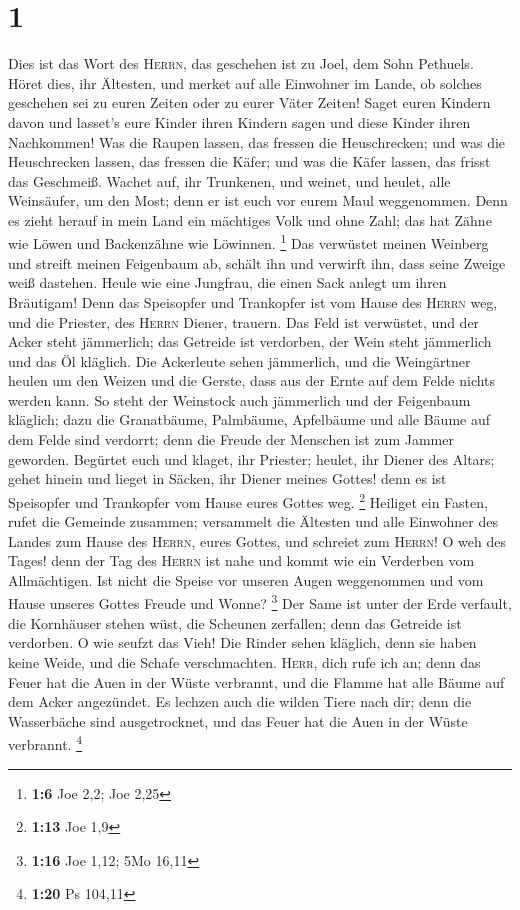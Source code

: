 \hypertarget{section}{%
\section{1}\label{section}}

 Dies ist das Wort des \textsc{Herrn}, das geschehen ist
zu Joel, dem Sohn Pethuels.  Höret dies, ihr Ältesten, und
merket auf alle Einwohner im Lande, ob solches geschehen sei zu euren
Zeiten oder zu eurer Väter Zeiten!  Saget euren Kindern
davon und lasset's eure Kinder ihren Kindern sagen und diese Kinder
ihren Nachkommen!  Was die Raupen lassen, das fressen die
Heuschrecken; und was die Heuschrecken lassen, das fressen die Käfer;
und was die Käfer lassen, das frisst das Geschmeiß. 
Wachet auf, ihr Trunkenen, und weinet, und heulet, alle Weinsäufer, um
den Most; denn er ist euch vor eurem Maul weggenommen. 
Denn es zieht herauf in mein Land ein mächtiges Volk und ohne Zahl; das
hat Zähne wie Löwen und Backenzähne wie Löwinnen. \footnote{\textbf{1:6}
  Joe 2,2; Joe 2,25}  Das verwüstet meinen Weinberg und
streift meinen Feigenbaum ab, schält ihn und verwirft ihn, dass seine
Zweige weiß dastehen.  Heule wie eine Jungfrau, die einen
Sack anlegt um ihren Bräutigam!  Denn das Speisopfer und
Trankopfer ist vom Hause des \textsc{Herrn} weg, und die Priester, des
\textsc{Herrn} Diener, trauern.  Das Feld ist verwüstet,
und der Acker steht jämmerlich; das Getreide ist verdorben, der Wein
steht jämmerlich und das Öl kläglich.  Die Ackerleute
sehen jämmerlich, und die Weingärtner heulen um den Weizen und die
Gerste, dass aus der Ernte auf dem Felde nichts werden kann.
 So steht der Weinstock auch jämmerlich und der
Feigenbaum kläglich; dazu die Granatbäume, Palmbäume, Apfelbäume und
alle Bäume auf dem Felde sind verdorrt; denn die Freude der Menschen ist
zum Jammer geworden.  Begürtet euch und klaget, ihr
Priester; heulet, ihr Diener des Altars; gehet hinein und lieget in
Säcken, ihr Diener meines Gottes! denn es ist Speisopfer und Trankopfer
vom Hause eures Gottes weg. \footnote{\textbf{1:13} Joe 1,9}
 Heiliget ein Fasten, rufet die Gemeinde zusammen;
versammelt die Ältesten und alle Einwohner des Landes zum Hause des
\textsc{Herrn}, eures Gottes, und schreiet zum \textsc{Herrn}!
 O weh des Tages! denn der Tag des \textsc{Herrn} ist
nahe und kommt wie ein Verderben vom Allmächtigen.  Ist
nicht die Speise vor unseren Augen weggenommen und vom Hause unseres
Gottes Freude und Wonne? \footnote{\textbf{1:16} Joe 1,12; 5Mo 16,11}
 Der Same ist unter der Erde verfault, die Kornhäuser
stehen wüst, die Scheunen zerfallen; denn das Getreide ist verdorben.
 O wie seufzt das Vieh! Die Rinder sehen kläglich, denn
sie haben keine Weide, und die Schafe verschmachten. 
\textsc{Herr}, dich rufe ich an; denn das Feuer hat die Auen in der
Wüste verbrannt, und die Flamme hat alle Bäume auf dem Acker angezündet.
 Es lechzen auch die wilden Tiere nach dir; denn die
Wasserbäche sind ausgetrocknet, und das Feuer hat die Auen in der Wüste
verbrannt. \footnote{\textbf{1:20} Ps 104,11}

